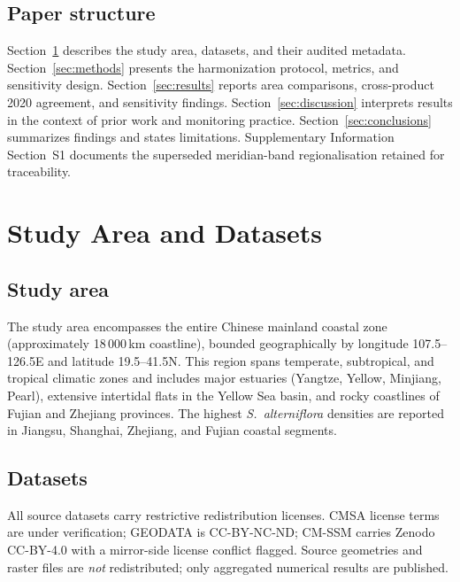 \documentclass[11pt]{article}
\begin{document}
\subsection{Paper structure}

Section~\ref{sec:study-area} describes the study area, datasets, and their
audited metadata. Section~\ref{sec:methods} presents the harmonization protocol,
metrics, and sensitivity design. Section~\ref{sec:results} reports area
comparisons, cross-product 2020 agreement, and sensitivity findings.
Section~\ref{sec:discussion} interprets results in the context of prior work
and monitoring practice. Section~\ref{sec:conclusions} summarizes findings and
states limitations. Supplementary Information Section~S1 documents the
superseded meridian-band regionalisation retained for traceability.

\section{Study Area and Datasets}
\label{sec:study-area}

\subsection{Study area}

The study area encompasses the entire Chinese mainland coastal zone
(approximately 18\,000\,km coastline), bounded geographically by longitude
107.5\textdegree{}--126.5\textdegree{}E and latitude 19.5\textdegree{}--41.5\textdegree{}N.
This region spans temperate, subtropical, and tropical climatic zones and
includes major estuaries (Yangtze, Yellow, Minjiang, Pearl), extensive
intertidal flats in the Yellow Sea basin, and rocky coastlines of Fujian and
Zhejiang provinces. The highest \textit{S.~alterniflora} densities are reported
in Jiangsu, Shanghai, Zhejiang, and Fujian coastal segments.

\subsection{Datasets}



All source datasets carry restrictive redistribution licenses. CMSA license terms
are under verification; GEODATA is CC-BY-NC-ND; CM-SSM carries Zenodo CC-BY-4.0
with a mirror-side license conflict flagged. Source geometries and raster files
are \emph{not} redistributed; only aggregated numerical results are published.
\end{document}
